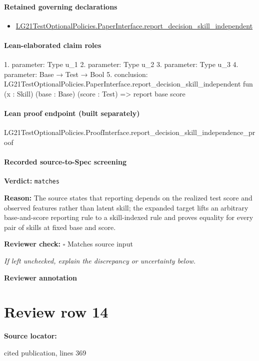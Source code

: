 \documentclass[10pt]{article}
\newcommand{\reviewerbox}{%
  \par\noindent\fbox{\parbox{0.96\linewidth}{\rule{0pt}{0.38in}}}\par
}
\newcommand{\reviewmatch}[1]{%
  \par\noindent\textbf{Reviewer check:} $\square$\; #1\par
  \noindent\emph{If left unchecked, explain the discrepancy or uncertainty below.}\par
}
\begin{document}
\paragraph{Retained governing declarations}
\begin{itemize}\raggedright
\item \hyperlink{governing-declaration-be2ee4e731a29bfb}{LG21\allowbreak{}Test\allowbreak{}Optional\allowbreak{}Policies.\allowbreak{}Paper\allowbreak{}Interface.\allowbreak{}report\_\allowbreak{}decision\_\allowbreak{}skill\_\allowbreak{}independent}
\end{itemize}
\paragraph{Lean-elaborated claim roles}\begin{ReviewVerbatim}
1. parameter: Type u_1
2. parameter: Type u_2
3. parameter: Type u_3
4. parameter: Base → Test → Bool
5. conclusion: LG21TestOptionalPolicies.PaperInterface.report_decision_skill_independent
  fun (x : Skill) (base : Base) (score : Test) => report base score
\end{ReviewVerbatim}

\paragraph{Lean proof endpoint (built separately)}\begin{ReviewVerbatim}
LG21TestOptionalPolicies.ProofInterface.report_decision_skill_independence_proof
\end{ReviewVerbatim}

\paragraph{Recorded source-to-Spec screening}
\textbf{Verdict:} \texttt{matches}
\\
{\raggedright
\textbf{Reason:} The source states that reporting depends on the realized test score and observed features rather than latent skill;\allowbreak{} the expanded target lifts an arbitrary base-\allowbreak{}and-\allowbreak{}score reporting rule to a skill-\allowbreak{}indexed rule and proves equality for every pair of skills at fixed base and score.\allowbreak{}
\par}
\reviewmatch{Matches source input}
\noindent\textbf{Reviewer annotation}\par
\reviewerbox
\clearpage
\hypertarget{source-claim-94c9c21b4a4d923b}{}
\section*{Review row 14}
\textbf{Source locator:} {\footnotesize\raggedright cited publication, lines 369\par}
\end{document}

